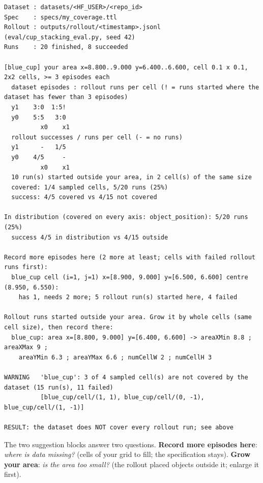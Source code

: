 \documentclass[11pt]{article}
\begin{document}
\begin{lstlisting}
Dataset : datasets/<HF_USER>/<repo_id>
Spec    : specs/my_coverage.ttl
Rollout : outputs/rollout/<timestamp>.jsonl  (eval/cup_stacking_eval.py, seed 42)
Runs    : 20 finished, 8 succeeded

[blue_cup] your area x=8.800..9.000 y=6.400..6.600, cell 0.1 x 0.1, 2x2 cells, >= 3 episodes each
  dataset episodes : rollout runs per cell (! = runs started where the dataset has fewer than 3 episodes)
  y1    3:0  1:5!
  y0    5:5   3:0
          x0    x1
  rollout successes / runs per cell (- = no runs)
  y1      -   1/5
  y0    4/5     -
          x0    x1
  10 run(s) started outside your area, in 2 cell(s) of the same size
  covered: 1/4 sampled cells, 5/20 runs (25%)
  success: 4/5 covered vs 4/15 not covered

In distribution (covered on every axis: object_position): 5/20 runs (25%)
  success 4/5 in distribution vs 4/15 outside

Record more episodes here (2 more at least; cells with failed rollout runs first):
  blue_cup cell (i=1, j=1) x=[8.900, 9.000] y=[6.500, 6.600] centre (8.950, 6.550):
    has 1, needs 2 more; 5 rollout run(s) started here, 4 failed

Rollout runs started outside your area. Grow it by whole cells (same cell size), then record there:
  blue_cup: area x=[8.800, 9.000] y=[6.400, 6.600] -> areaXMin 8.8 ; areaXMax 9 ;
    areaYMin 6.3 ; areaYMax 6.6 ; numCellW 2 ; numCellH 3

WARNING   'blue_cup': 3 of 4 sampled cell(s) are not covered by the dataset (15 run(s), 11 failed)
          [blue_cup/cell/(1, 1), blue_cup/cell/(0, -1), blue_cup/cell/(1, -1)]

RESULT: the dataset does NOT cover every rollout run; see above
\end{lstlisting}

The two suggestion blocks answer two questions. \textbf{Record more episodes here}: \emph{where is data
missing?} (cells of your grid to fill; the specification stays). \textbf{Grow your area}: \emph{is the area too
small?} (the rollout placed objects outside it; enlarge it first).
\end{document}
